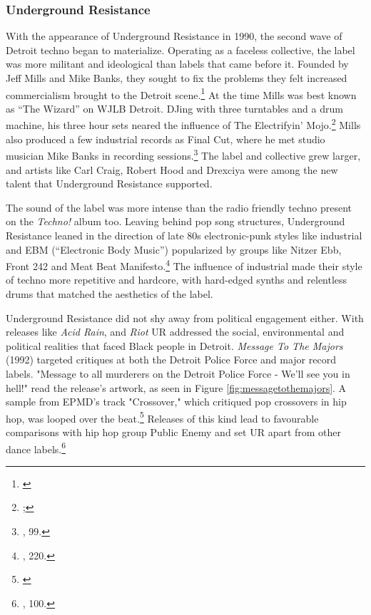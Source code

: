 \documentclass[12pt,twoside]{reedthesis}
\begin{document}
\subsubsection{Underground Resistance}

With the appearance of Underground Resistance in 1990, the second wave of Detroit techno began to materialize. Operating as a faceless collective, the label was more militant and ideological than labels that came before it. Founded by Jeff Mills and Mike Banks, they sought to fix the problems they felt increased commercialism brought to the Detroit scene.\footnote{\cite{schmidtJeffMillsLecture1998a}} At the time Mills was best known as ``The Wizard'' on WJLB Detroit. DJing with three turntables and a drum machine, his three hour sets neared the influence of The Electrifyin' Mojo.\footnote{\cite{schmidtJeffMillsLecture1998a};\cite{broughtonInterviewJeffMills2017a}} Mills also produced a few industrial records as Final Cut, where he met studio musician Mike Banks in recording sessions.\footnote{\cite{sickoTechnoRebelsRenegades2010}, 99.} The label and collective grew larger, and artists like Carl Craig, Robert Hood and Drexciya were among the new talent that Underground Resistance supported.

The sound of the label was more intense than the radio friendly techno present on the \emph{Techno!} album too. Leaving behind pop song structures, Underground Resistance leaned in the direction of late 80s electronic-punk styles like industrial and EBM (``Electronic Body Music'') popularized by groups like Nitzer Ebb, Front 242 and Meat Beat Manifesto.\footnote{\cite{reynoldsGenerationEcstasyWorld1998}, 220.} The influence of industrial made their style of techno more repetitive and hardcore, with hard-edged synths and relentless drums that matched the aesthetics of the label.

Underground Resistance did not shy away from political engagement either. With releases like \emph{Acid Rain}, and \emph{Riot} UR addressed the social, environmental and political realities that faced Black people in Detroit. \emph{Message To The Majors} (1992) targeted critiques at both the Detroit Police Force and major record labels. "Message to all murderers on the Detroit Police Force - We'll see you in hell!" read the release's artwork, as seen in Figure \ref{fig:messagetothemajors}. A sample from EPMD's track "Crossover," which critiqued pop crossovers in hip hop, was looped over the beat.\footnote{\cite{undergroundresistanceMessageMajors1992a}} Releases of this kind lead to favourable comparisons with hip hop group Public Enemy and set UR apart from other dance labels.\footnote{\cite{sickoTechnoRebelsRenegades2010}, 100.}
\end{document}
